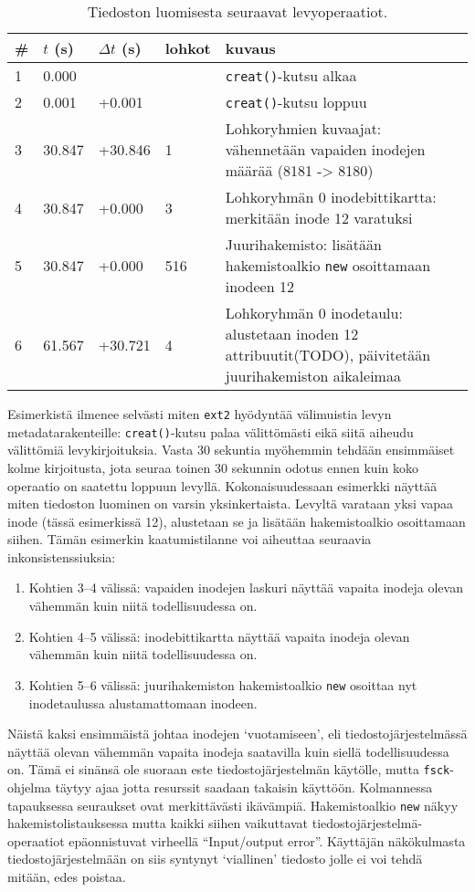 \begin{table}[H]
\label{TabExt2Creation}
\begin{tabular}{l | l | l | l | p{7cm}}
    \# & $t$ (s) & $\Delta t$ (s) & lohkot & kuvaus \\ \hline \hline
    1  & 0.000    &          &     & \texttt{creat()}-kutsu alkaa   \\ \hline %
    2  & 0.001    & +0.001   &     & \texttt{creat()}-kutsu loppuu  \\ \hline %
    3  & 30.847   & +30.846  & 1   & Lohkoryhmien kuvaajat: vähennetään vapaiden inodejen määrää (8181 -> 8180)         \\ \hline %
    4  & 30.847   & +0.000   & 3   & Lohkoryhmän 0 inodebittikartta: merkitään inode 12 varatuksi \\ \hline %
    5  & 30.847   & +0.000   & 516 & Juurihakemisto: lisätään hakemistoalkio \texttt{new} osoittamaan inodeen 12                 \\ \hline %
    6  & 61.567   & +30.721  & 4   & Lohkoryhmän 0 inodetaulu: alustetaan inoden 12 attribuutit(TODO), päivitetään juurihakemiston aikaleimaa \\        %
\end{tabular}
\caption{Tiedoston luomisesta seuraavat levyoperaatiot.}
\end{table}
%
Esimerkistä ilmenee selvästi miten \texttt{ext2} hyödyntää välimuistia levyn metadatarakenteille: \texttt{creat()}-kutsu palaa välittömästi eikä siitä aiheudu välittömiä levykirjoituksia.
Vasta 30 sekuntia myöhemmin tehdään ensimmäiset kolme kirjoitusta,
jota seuraa toinen 30 sekunnin odotus ennen kuin koko operaatio on saatettu loppuun levyllä.
Kokonaisuudessaan esimerkki näyttää miten tiedoston luominen on varsin yksinkertaista.
Levyltä varataan yksi vapaa inode (tässä esimerkissä 12), alustetaan se ja lisätään hakemistoalkio osoittamaan siihen.
Tämän esimerkin kaatumistilanne voi aiheuttaa seuraavia inkonsistenssiuksia:
\begin{enumerate}
    \item{Kohtien 3--4 välissä: vapaiden inodejen laskuri näyttää vapaita inodeja olevan vähemmän kuin niitä todellisuudessa on.}
    \item{Kohtien 4--5 välissä: inodebittikartta näyttää vapaita inodeja olevan vähemmän kuin niitä todellisuudessa on.}
    \item{Kohtien 5--6 välissä: juurihakemiston hakemistoalkio \texttt{new} osoittaa nyt inodetaulussa alustamattomaan inodeen.}
\end{enumerate}
%
Näistä kaksi ensimmäistä johtaa inodejen `vuotamiseen',
eli tiedostojärjestelmässä näyttää olevan vähemmän vapaita inodeja saatavilla kuin siellä todellisuudessa on.
Tämä ei sinänsä ole suoraan este tiedostojärjestelmän käytölle,
mutta \texttt{fsck}-ohjelma täytyy ajaa jotta resurssit saadaan takaisin käyttöön.
Kolmannessa tapauksessa seuraukset ovat merkittävästi ikävämpiä.
Hakemistoalkio \texttt{new} näkyy hakemistolistauksessa mutta kaikki siihen vaikuttavat tiedostojärjestelmä-operaatiot epäonnistuvat virheellä ``Input/output error''.
Käyttäjän näkökulmasta tiedostojärjestelmään on siis syntynyt `viallinen' tiedosto jolle ei voi tehdä mitään, edes poistaa.

